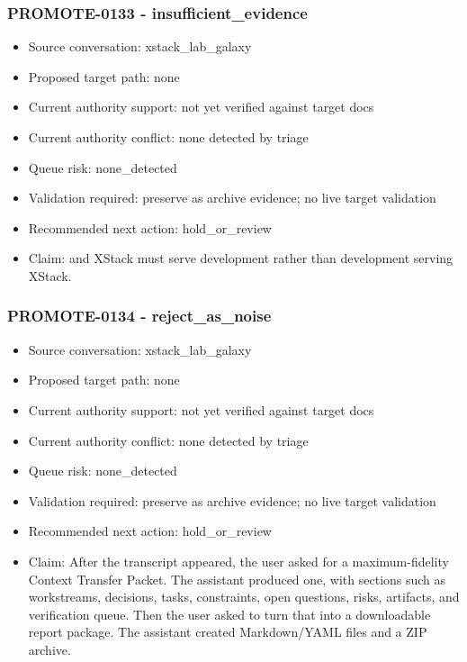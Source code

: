 \documentclass[11pt,a4paper]{report}
\begin{document}
\subsubsection{PROMOTE-0133 - insufficient\_evidence}

\begin{itemize}
\item Source conversation: xstack\_lab\_galaxy
\item Proposed target path: none
\item Current authority support: not yet verified against target docs
\item Current authority conflict: none detected by triage
\item Queue risk: none\_detected
\item Validation required: preserve as archive evidence; no live target validation
\item Recommended next action: hold\_or\_review
\item Claim: and XStack must serve development rather than development serving XStack.
\end{itemize}

\subsubsection{PROMOTE-0134 - reject\_as\_noise}

\begin{itemize}
\item Source conversation: xstack\_lab\_galaxy
\item Proposed target path: none
\item Current authority support: not yet verified against target docs
\item Current authority conflict: none detected by triage
\item Queue risk: none\_detected
\item Validation required: preserve as archive evidence; no live target validation
\item Recommended next action: hold\_or\_review
\item Claim: After the transcript appeared, the user asked for a maximum-fidelity Context Transfer Packet. The assistant produced one, with sections such as workstreams, decisions, tasks, constraints, open questions, risks, artifacts, and verification queue. Then the user asked to turn that into a downloadable report package. The assistant created Markdown/YAML files and a ZIP archive.
\end{itemize}
\end{document}
